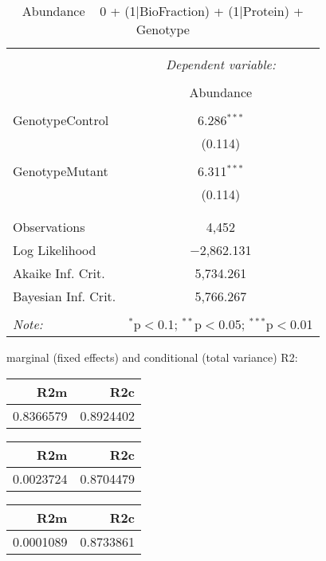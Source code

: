 \documentclass[11pt]{report}
\begin{document}
\begin{table}[!htbp] \centering 
  \caption{Abundance ~ 0 + (1|BioFraction) + (1|Protein) + Genotype} 
  \label{} 
\begin{tabular}{@{\extracolsep{5pt}}lc} 
\\[-1.8ex]\hline 
\hline \\[-1.8ex] 
 & \multicolumn{1}{c}{\textit{Dependent variable:}} \\ 
\cline{2-2} 
\\[-1.8ex] & Abundance \\ 
\hline \\[-1.8ex] 
 GenotypeControl & 6.286$^{***}$ \\ 
  & (0.114) \\ 
  & \\ 
 GenotypeMutant & 6.311$^{***}$ \\ 
  & (0.114) \\ 
  & \\ 
\hline \\[-1.8ex] 
Observations & 4,452 \\ 
Log Likelihood & $-$2,862.131 \\ 
Akaike Inf. Crit. & 5,734.261 \\ 
Bayesian Inf. Crit. & 5,766.267 \\ 
\hline 
\hline \\[-1.8ex] 
\textit{Note:}  & \multicolumn{1}{r}{$^{*}$p$<$0.1; $^{**}$p$<$0.05; $^{***}$p$<$0.01} \\ 
\end{tabular} 
\end{table} 
marginal (fixed effects) and conditional (total variance) R2:

\begin{tabular}{r|r}
\hline
R2m & R2c\\
\hline
0.8366579 & 0.8924402\\
\hline
\end{tabular}

\begin{tabular}{r|r}
\hline
R2m & R2c\\
\hline
0.0023724 & 0.8704479\\
\hline
\end{tabular}

\begin{tabular}{r|r}
\hline
R2m & R2c\\
\hline
0.0001089 & 0.8733861\\
\hline
\end{tabular}
\end{document}

